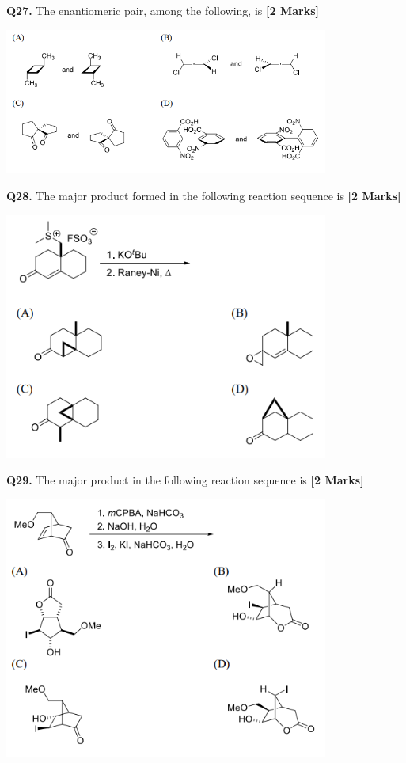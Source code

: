 \documentclass[11pt]{article}
\newcommand{\questionb}[2]{
    \noindent\textbf{Q#2.} #1 \hfill \textbf{[2 Marks]}
}
\begin{document}
\questionb{The enantiomeric pair, among the following, is}{27}
\begin{center}
\includegraphics[width=0.8\textwidth]{figures/27.png}
\end{center}
\vspace{0.5cm}

\questionb{The major product formed in the following reaction sequence is}{28}
\begin{center}
\includegraphics[width=0.8\textwidth]{figures/28.png}
\end{center}

\vspace{0.5cm}

\questionb{The major product in the following reaction sequence is}{29}
\begin{center}
\includegraphics[width=0.8\textwidth]{figures/29.png}
\end{center}
\end{document}
